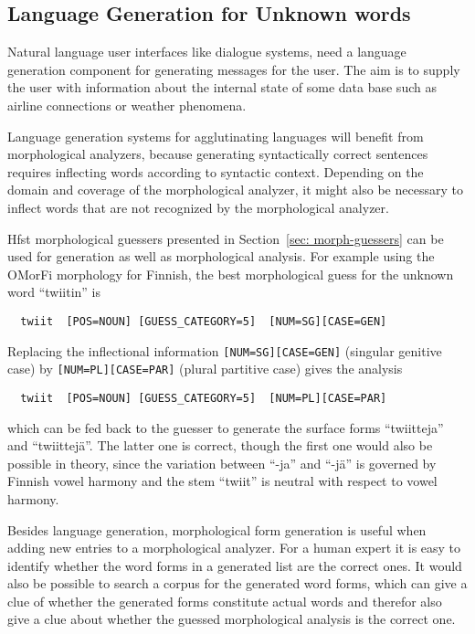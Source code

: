 \documentclass{llncs}
\begin{document}
\subsection{Language Generation for Unknown words}
\label{sec:morph-generation}
Natural language user interfaces like dialogue systems, need a
language generation component for generating messages for the
user. The aim is to supply the user with information about the
internal state of some data base such as airline connections or
weather phenomena.

Language generation systems for agglutinating languages will benefit
from morphological analyzers, because generating syntactically correct
sentences requires inflecting words according to syntactic
context. Depending on the domain and coverage of the morphological
analyzer, it might also be necessary to inflect words that are not
recognized by the morphological analyzer. 

Hfst morphological guessers presented in Section~\ref{sec:
  morph-guessers} can be used for generation as well as morphological
analysis. For example using the OMorFi morphology for Finnish, the
best morphological guess for the unknown word ``twiitin'' is
\begin{verbatim}
  twiit  [POS=NOUN] [GUESS_CATEGORY=5]  [NUM=SG][CASE=GEN]
\end{verbatim}
Replacing the inflectional information {\tt [NUM=SG][CASE=GEN]}
(singular genitive case) by {\tt [NUM=PL][CASE=PAR]} (plural
partitive case) gives the analysis
\begin{verbatim}
  twiit  [POS=NOUN] [GUESS_CATEGORY=5]  [NUM=PL][CASE=PAR]
\end{verbatim}
which can be fed back to the guesser to generate the surface forms
``twiitteja'' and ``twiittejä''. The latter one is correct, though the
first one would also be possible in theory, since the variation
between ``-ja'' and ``-jä'' is governed by Finnish vowel harmony and
the stem ``twiit'' is neutral with respect to vowel harmony.

Besides language generation, morphological form generation is useful
when adding new entries to a morphological analyzer. For a human
expert it is easy to identify whether the word forms in a generated
list are the correct ones. It would also be possible to search a
corpus for the generated word forms, which can give a clue of whether
the generated forms constitute actual words and therefor also give a
clue about whether the guessed morphological analysis is the correct
one.
\end{document}

